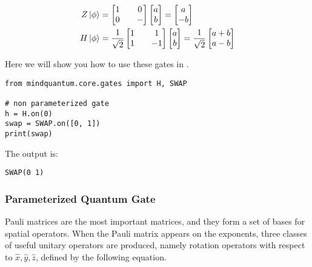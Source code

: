 \begin{align*}
    Z\ket{\phi} & =
    \begin{bmatrix}
        1 &  & 0 \\
        0 &  & -
    \end{bmatrix}
    \begin{bmatrix}
        a \\
        b
    \end{bmatrix}=
    \begin{bmatrix}
        a \\
        -b
    \end{bmatrix} \\
    H\ket{\phi} & =
    \frac{1}{\sqrt{2}}
    \begin{bmatrix}
        1 &  & 1  \\
        1 &  & -1
    \end{bmatrix}
    \begin{bmatrix}
        a \\
        b
    \end{bmatrix}=
    \frac{1}{\sqrt{2}}
    \begin{bmatrix}
        a+b \\
        a-b
    \end{bmatrix}
\end{align*}

Here we will show you how to use these gates in \MindQuantum.

\begin{lstlisting}
from mindquantum.core.gates import H, SWAP

# non parameterized gate
h = H.on(0)
swap = SWAP.on([0, 1])
print(swap)
\end{lstlisting}
The output is:
\begin{lstlisting}
SWAP(0 1)
\end{lstlisting}

\subsubsection{Parameterized Quantum Gate}
Pauli matrices are the most important matrices, and they form a set of bases for spatial operators. When the Pauli matrix appears on the exponents, three classes of useful unitary operators are produced, namely rotation operators with respect to $\hat{x}, \hat{y}, \hat{z}$, defined by the following equation.

